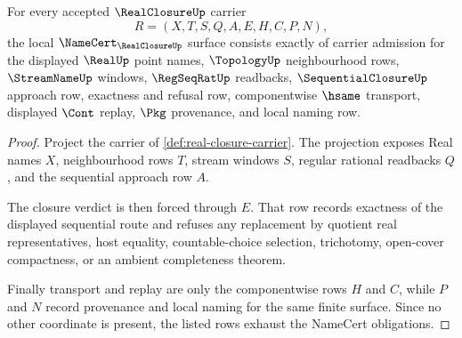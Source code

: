 \begin{theorem}
\label{thm:real-closure-namecert-obligations}
For every accepted $\RealClosureUp$ carrier
$$
R=(X,T,S,Q,A,E,H,C,P,N),
$$
the local $\NameCert_{\RealClosureUp}$ surface consists exactly of carrier admission for the displayed $\RealUp$ point names, $\TopologyUp$ neighbourhood rows, $\StreamNameUp$ windows, $\RegSeqRatUp$ readbacks, $\SequentialClosureUp$ approach row, exactness and refusal row, componentwise $\hsame$ transport, displayed $\Cont$ replay, $\Pkg$ provenance, and local naming row.
\end{theorem}
\begin{proof}
Project the carrier of \autoref{def:real-closure-carrier}. The projection exposes Real names $X$, neighbourhood rows $T$, stream windows $S$, regular rational readbacks $Q$, and the sequential approach row $A$.

The closure verdict is then forced through $E$. That row records exactness of the displayed sequential route and refuses any replacement by quotient real representatives, host equality, countable-choice selection, trichotomy, open-cover compactness, or an ambient completeness theorem.

Finally transport and replay are only the componentwise rows $H$ and $C$, while $P$ and $N$ record provenance and local naming for the same finite surface. Since no other coordinate is present, the listed rows exhaust the NameCert obligations.
\end{proof}

